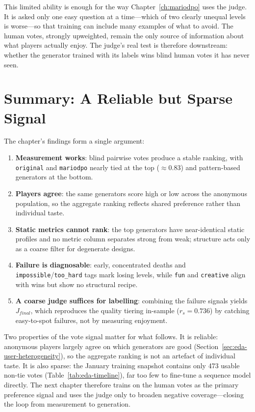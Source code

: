 \documentclass[shortabstract, mgr, english]{iithesis}
\begin{document}
This limited ability is enough for the way Chapter~\ref{ch:mariodpo}
uses the judge. It is asked only one easy question at a time---which of two
clearly unequal levels is worse---so that training can include many examples
of what to avoid. The human votes, strongly upweighted, remain the only source
of information about what players actually enjoy. The judge's real test is
therefore downstream: whether the generator trained with its labels wins blind
human votes it has never seen.

\section[Summary: A Reliable but Sparse Signal]{Summary: A Reliable but Sparse Signal}
\label{sec:eda-summary}

The chapter's findings form a single argument:
\begin{enumerate}[nosep]
    \item \textbf{Measurement works}: blind pairwise votes produce a stable ranking, with \texttt{original} and \texttt{mariodpo} nearly tied at the top ($\approx$0.83) and pattern-based generators at the bottom.
    \item \textbf{Players agree}: the same generators score high or low across the anonymous population, so the aggregate ranking reflects shared preference rather than individual taste.
    \item \textbf{Static metrics cannot rank}: the top generators have near-identical static profiles and no metric column separates strong from weak; structure acts only as a coarse filter for degenerate designs.
    \item \textbf{Failure is diagnosable}: early, concentrated deaths and \texttt{impossible}/\texttt{too\_hard} tags mark losing levels, while \texttt{fun} and \texttt{creative} align with wins but show no structural recipe.
    \item \textbf{A coarse judge suffices for labelling}: combining the failure signals yields $J_{final}$, which reproduces the quality tiering in-sample ($r_s = 0.736$) by catching easy-to-spot failures, not by measuring enjoyment.
\end{enumerate}

Two properties of the vote signal matter for what follows. It is
reliable: anonymous players largely agree on which generators are good
(Section~\ref{sec:eda-user-heterogeneity}), so the aggregate ranking is not an
artefact of individual taste. It is also sparse: the
January training snapshot contains only 473 usable non-tie votes
(Table~\ref{tab:eda-timeline}), far too few to fine-tune a sequence model
directly. The next chapter therefore trains on the human votes as the primary
preference signal and uses the judge only to broaden negative
coverage---closing the loop from measurement to generation.
\end{document}
